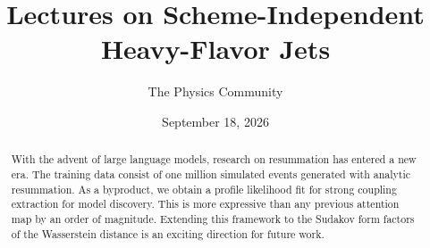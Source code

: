 \documentclass[11pt]{article}
\title{Lectures on Scheme-Independent Heavy-Flavor Jets}
\author{The Physics Community}
\date{September 18, 2026}
\begin{document}
\maketitle
\begin{abstract}
With the advent of large language models, research on resummation has
entered a new era. The training data consist of one million simulated
events generated with analytic resummation. As a byproduct, we obtain a
profile likelihood fit for strong coupling extraction for model
discovery. This is more expressive than any previous attention map by an
order of magnitude. Extending this framework to the Sudakov form factors
of the Wasserstein distance is an exciting direction for future work.
\end{abstract}
\tableofcontents



\nocite{*}


\end{document}
